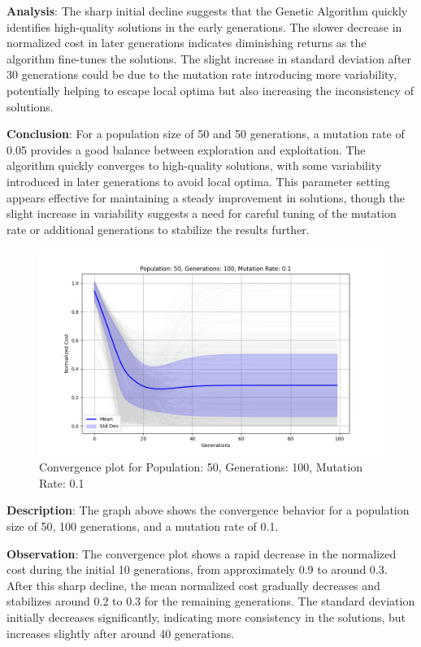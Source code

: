 \documentclass{article}
\begin{document}
    \textbf{Analysis}: The sharp initial decline suggests that the Genetic Algorithm quickly identifies high-quality solutions in the early generations. The slower decrease in normalized cost in later generations indicates diminishing returns as the algorithm fine-tunes the solutions. The slight increase in standard deviation after 30 generations could be due to the mutation rate introducing more variability, potentially helping to escape local optima but also increasing the inconsistency of solutions.

    \textbf{Conclusion}: For a population size of 50 and 50 generations, a mutation rate of 0.05 provides a good balance between exploration and exploitation. The algorithm quickly converges to high-quality solutions, with some variability introduced in later generations to avoid local optima. This parameter setting appears effective for maintaining a steady improvement in solutions, though the slight increase in variability suggests a need for careful tuning of the mutation rate or additional generations to stabilize the results further.

    \begin{figure}[H]
        \centering
        \includegraphics[width=\textwidth]{genetic_algorithm/Population_50_Generations_100_MutationRate_0.1}
        \caption{Convergence plot for Population: 50, Generations: 100, Mutation Rate: 0.1}
        \label{fig:ga_50_100_1}
    \end{figure}

    \textbf{Description}: The graph above shows the convergence behavior for a population size of 50, 100 generations, and a mutation rate of 0.1.

    \textbf{Observation}: The convergence plot shows a rapid decrease in the normalized cost during the initial 10 generations, from approximately 0.9 to around 0.3. After this sharp decline, the mean normalized cost gradually decreases and stabilizes around 0.2 to 0.3 for the remaining generations. The standard deviation initially decreases significantly, indicating more consistency in the solutions, but increases slightly after around 40 generations.
\end{document}
